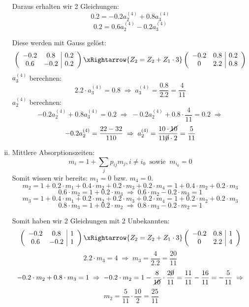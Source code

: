\documentclass{scrreprt}
\begin{document}
\begin{uebsp}
\begin{Answer}
\begin{enumerate}[i)]
        Daraus erhalten wir 2 Gleichungen:
        \[0.2=-0.2a_2^{(4)}+0.8a_3^{(4)}\]
        \[0.2=0.6a_2^{(4)}-0.2a_3^{(4)}\]

        Diese werden mit Gauss gelöst:
        \[\left(\begin{array}{cc|c}
        -0.2 & 0.8 & 0.2\\
        0.6 & -0.2 & 0.2\\
        \end{array}\right)\xRightarrow{Z_2=Z_2+Z_1\cdot 3}
        \left(\begin{array}{cc|c}
        -0.2 & 0.8 & 0.2\\
        0 & 2.2 & 0.8\\
        \end{array}\right)\]
        $a_3^{(4)}$ berechnen:
        \[2.2\cdot a_3^{(4)}=0.8\;\Rightarrow\;a_3^{(4)}=\frac{0.8}{2.2}=\frac{4}{11}\]
        $a_2^{(4)}$ berechnen:
        \[-0.2a_2^{(4)}+0.8a_3^{(4)}=0.2\;\Rightarrow\;-0.2a_2^{(4)}+0.8\cdot\frac{4}{11}=0.2\;\Rightarrow\]
        \[-0.2a_2^{(4)}=\frac{22-32}{110}\;\Rightarrow\;a_2^{(4)}=\frac{10\cdot \cancel{10}}{11\cancel0\cdot 2}=\frac{5}{11}\]
    \item Mittlere Absorptionszeiten:
        \[m_i=1+\sum_{j}p_{ij}m_j, i\neq i_0\;\;\text{sowie}\;\;m_{i_0}=0\]
        Somit wissen wir bereits: $m_1=0$ bzw. $m_4=0$.
        \[m_2=1+0.2\cdot m_1+0.4\cdot m_2+0.2\cdot m_3+0.2\cdot m_4=1+0.4\cdot m_2+0.2\cdot m_3\]
        \[0.6\cdot m_2=1+0.2\cdot m_3\;\Rightarrow\;0.6\cdot m_2-0.2\cdot m_3=1\]
        \[m_3=1+0.4\cdot m_1+0.2\cdot m_2+0.2\cdot m_3+0.2\cdot m_4=1+0.2\cdot m_2+0.2\cdot m_3\]
        \[0.8\cdot m_3=1+0.2\cdot m_2\;\Rightarrow\;0.8\cdot m_3-0.2\cdot m_2=1\]

        Somit haben wir 2 Gleichungen mit 2 Unbekannten:
        \[\left(\begin{array}{cc|c}
        -0.2 & 0.8 & 1\\
        0.6 & -0.2 & 1\\
        \end{array}\right)\xRightarrow{Z_2=Z_2+Z_1\cdot 3}
        \left(\begin{array}{cc|c}
        -0.2 & 0.8 & 1\\
        0 & 2.2 & 4\\
        \end{array}\right)\]
        \[2.2\cdot m_3=4\;\Rightarrow\;m_3=\frac{4}{2.2}=\frac{20}{11}\]
        \[-0.2\cdot m_2+0.8\cdot m_3=1\;\Rightarrow\;-0.2\cdot m_2=1-\frac{8}{\cancel{10}}\cdot \frac{2\cancel{0}}{11}=\frac{11}{11}-\frac{16}{11}=-\frac{5}{11}\;\Rightarrow\]
        \[\;m_2=\frac{5}{11}\cdot \frac{10}{2}=\frac{25}{11}\]

\end{enumerate}
\end{Answer}
\end{uebsp}
\end{document}
